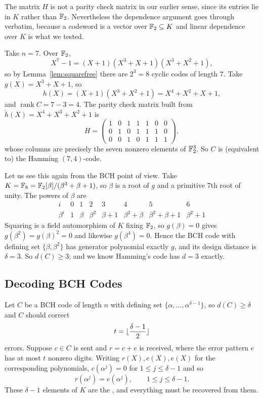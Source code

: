 \documentclass[a4paper]{scrartcl}
\DeclarePairedDelimiter{\floor}{\lfloor}{\rfloor}
\DeclareMathOperator{\rank}{rank}
\begin{document}
\begin{remark}
	The matrix $H$ is not a parity check matrix in our earlier sense, since its entries lie in $K$ rather than $\mathbb{F}_2$. Nevertheless the dependence argument goes through verbatim, because a codeword is a vector over $\mathbb{F}_2 \subseteq K$ and linear dependence over $K$ is what we tested.
\end{remark}

\begin{example}\label{ex:bch7}
	Take $n = 7$. Over $\mathbb{F}_2$,
	$$X^7-1 = (X+1)(X^3+X+1)(X^3+X^2+1),$$
	so by Lemma~\ref{lem:squarefree} there are $2^3 = 8$ cyclic codes of length $7$. Take $g(X) = X^3+X+1$, so
	$$h(X) = (X+1)(X^3+X^2+1) = X^4+X^2+X+1,$$
	and $\rank C = 7 - 3 = 4$. The parity check matrix built from $\check h(X) = X^4 + X^3 + X^2 + 1$ is
	$$H = \begin{pmatrix} 1&0&1&1&1&0&0\\0&1&0&1&1&1&0\\0&0&1&0&1&1&1\end{pmatrix},$$
	whose columns are precisely the seven nonzero elements of $\mathbb{F}_2^3$. So $C$ is (equivalent to) the Hamming $(7,4)$-code.

	Let us see this again from the BCH point of view. Take $K = \mathbb{F}_8 = \mathbb{F}_2[\beta]/(\beta^3+\beta+1)$, so $\beta$ is a root of $g$ and a primitive $7$th root of unity. The powers of $\beta$ are
	$$\begin{array}{c|ccccccc}
		i & 0&1&2&3&4&5&6\\\hline
		\beta^i & 1 & \beta & \beta^2 & \beta+1 & \beta^2+\beta & \beta^2+\beta+1 & \beta^2+1
	\end{array}$$
	Squaring is a field automorphism of $K$ fixing $\mathbb{F}_2$, so $g(\beta) = 0$ gives $g(\beta^2) = g(\beta)^2 = 0$ and likewise $g(\beta^4)=0$. Hence the BCH code with defining set $\{\beta,\beta^2\}$ has generator polynomial exactly $g$, and its design distance is $\delta = 3$. So $d(C)\ge3$; and we know Hamming's code has $d = 3$ exactly.
\end{example}

\subsection{Decoding BCH Codes}

Let $C$ be a BCH code of length $n$ with defining set $\{\alpha,\dots,\alpha^{\delta-1}\}$, so $d(C)\ge\delta$ and $C$ should correct
$$t = \floor{\frac{\delta-1}{2}}$$
errors. Suppose $c \in C$ is sent and $r = c+e$ is received, where the error pattern $e$ has at most $t$ nonzero digits. Writing $r(X), c(X), e(X)$ for the corresponding polynomials, $c(\alpha^j)=0$ for $1\le j\le\delta-1$ and so
$$r(\alpha^j) = e(\alpha^j), \qquad 1 \le j \le \delta-1.$$
These $\delta-1$ elements of $K$ are the , and everything must be recovered from them.
\end{document}

